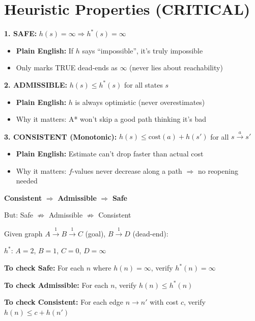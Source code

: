 \documentclass[11pt,a4paper]{article}
\begin{document}
\section{Heuristic Properties (CRITICAL)}

\begin{definitionbox}
\textbf{1. SAFE:} $h(s) = \infty \Rightarrow h^*(s) = \infty$
\begin{itemize}[leftmargin=*,nosep]
\item \textbf{Plain English:} If $h$ says ``impossible'', it's truly impossible
\item Only marks TRUE dead-ends as $\infty$ (never lies about reachability)
\end{itemize}

\textbf{2. ADMISSIBLE:} $h(s) \leq h^*(s)$ for all states $s$
\begin{itemize}[leftmargin=*,nosep]
\item \textbf{Plain English:} $h$ is always optimistic (never overestimates)
\item Why it matters: A* won't skip a good path thinking it's bad
\end{itemize}

\textbf{3. CONSISTENT (Monotonic):} $h(s) \leq \text{cost}(a) + h(s')$ for all $s \xrightarrow{a} s'$
\begin{itemize}[leftmargin=*,nosep]
\item \textbf{Plain English:} Estimate can't drop faster than actual cost
\item Why it matters: $f$-values never decrease along a path $\Rightarrow$ no reopening needed
\end{itemize}
\end{definitionbox}

\begin{warningbox}
\textbf{Consistent} $\Rightarrow$ \textbf{Admissible} $\Rightarrow$ \textbf{Safe}

But: Safe $\not\Rightarrow$ Admissible $\not\Rightarrow$ Consistent
\end{warningbox}

\begin{examplebox}
Given graph $A \xrightarrow{1} B \xrightarrow{1} C$ (goal), $B \xrightarrow{1} D$ (dead-end):

$h^*$: $A=2$, $B=1$, $C=0$, $D=\infty$

\textbf{To check Safe:} For each $n$ where $h(n)=\infty$, verify $h^*(n)=\infty$

\textbf{To check Admissible:} For each $n$, verify $h(n) \leq h^*(n)$

\textbf{To check Consistent:} For each edge $n \to n'$ with cost $c$, verify $h(n) \leq c + h(n')$
\end{examplebox}
\end{document}
